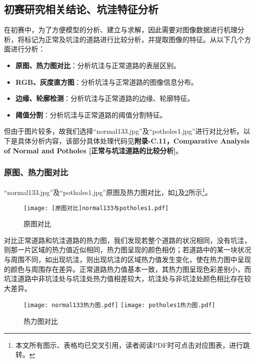 \documentclass{MathorCupmodeling}
\begin{document}
	\subsection{初赛研究相关结论、坑洼特征分析}\label{分析}
	在初赛中，为了方便模型的分析、建立与求解，因此需要对图像数据进行机理分析，将标记为正常及坑洼的道路进行比较分析，并提取图像的特征。从以下几个方面进行分析：
	\begin{itemize}
		\item \textbf{原图、热力图对比}：分析坑洼与正常道路的表层区别。
		\item \textbf{RGB、灰度直方图}：分析坑洼与正常道路的图像信息分布。
		\item \textbf{边缘、轮廓检测}：分析坑洼与正常道路的边缘、轮廓特征。
		\item \textbf{阈值分割}：分析坑洼与正常道路的阈值分割特征。
	\end{itemize}
	
	但由于图片较多，故我们选择“normal133.jpg”及“potholes1.jpg”进行对比分析。以下是具体分析内容，该部分具体处理代码见\textbf{附录-C.11，Comparative Analysis of Normal and Potholes [正常与坑洼道路的比较分析]}。
	\subsubsection{原图、热力图对比}
	“normal133.jpg”及“potholes1.jpg”原图及热力图对比，如\textcolor{blue}{\cref{fig:原图对比}}及\textcolor{blue}{\cref{fig:热力图对比}}所示\textcolor{blue}{\footnote{本文所有图示、表格均已交叉引用，读者阅读PDF时可点击对应图表，进行跳转。}}。
	\begin{figure}[H]
		\centering
			\centering
			\texttt{[image: [原图对比]normal133与potholes1.pdf]}
			\caption{原图对比}
			\label{fig:原图对比}
	\end{figure}
	
	对比正常道路和坑洼道路的热力图，我们发现若整个道路的状况相同，没有坑洼，则那一片区域的热力值近似相同，热力图呈现的颜色相仿；若道路中的某一块状况与周围不同，如出现坑洼，则出现坑洼的区域热力值发生变化，使在热力图中呈现的颜色与周围存在差异。正常道路热力值基本一致，其热力图呈现色彩差别小，而坑洼道路中非坑洼处与坑洼处热力值相差较大，坑洼处与非坑洼处颜色相比存在较大差异。
	\begin{figure}[H]
		\centering
		\texttt{[image: normal133热力图.pdf]}
		\hspace{0.3in}
		\texttt{[image: potholes1热力图.pdf]}
		\caption{热力图对比}
		\label{fig:热力图对比}
	\end{figure}
\end{document}
